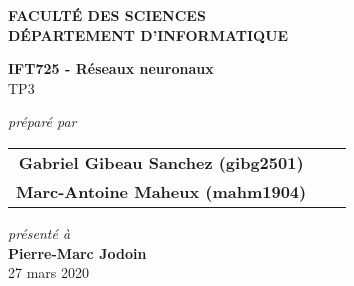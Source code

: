 \documentclass[letterpaper, 12pt]{article}
\begin{document}
    \begin{titlepage}
        \begin{center}
            \begin{large}
                \textbf{FACULTÉ DES SCIENCES} \\
                \textbf{DÉPARTEMENT D'INFORMATIQUE}
            \end{large}
            \vfill
            \begin{Large}
                \textbf{IFT725 - Réseaux neuronaux} \\
                TP3
            \end{Large}
            \vfill
            \textit{préparé par} \\
            \begin{tabular}{ccc}
                \textbf{Gabriel Gibeau Sanchez (gibg2501)} \\ \textbf{Marc-Antoine Maheux (mahm1904)}
            \end{tabular}
            \vfill
            \textit{présenté à} \\
            \textbf{Pierre-Marc Jodoin} \\
            \vfill
            27 mars 2020
        \end{center}
    \end{titlepage}
    \pagebreak
    
    
    \pagebreak
    
    \renewcommand{\figurename}{Figure}
    \renewcommand{\cftfigpresnum}{Figure }
    \renewcommand{\cftfignumwidth}{2cm}
%    
    \renewcommand{\tablename}{Tableau}
    \renewcommand{\cfttabpresnum}{Tableau }
    \renewcommand{\cfttabnumwidth}{2cm}
    
    
    

    
    
    
    
\end{document}
